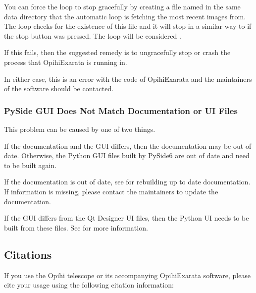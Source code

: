 \documentclass[letterpaper,11pt,english]{sphinxmanual}
\begin{document}
\sphinxAtStartPar
You can force the loop to stop gracefully by creating a file named
 in the same data directory that the automatic
loop is fetching the most recent images from. The loop checks for the
existence of this file and it will stop in a similar way to if the stop button
was pressed. The loop will be considered .

\sphinxAtStartPar
If this fails, then the suggested remedy is to ungracefully stop or crash the
process that OpihiExarata is running in.

\sphinxAtStartPar
In either case, this is an error with the code of OpihiExarata and the
maintainers of the software should be contacted.


\subsubsection{PySide GUI Does Not Match Documentation or UI Files}
\label{\detokenize{user/troubleshooting:pyside-gui-does-not-match-documentation-or-ui-files}}\label{\detokenize{user/troubleshooting:user-troubleshooting-pyside-gui-does-not-match-documentation-or-ui-files}}
\sphinxAtStartPar
This problem can be caused by one of two things.

\sphinxAtStartPar
If the documentation and the GUI differs, then the documentation may be out of
date. Otherwise, the Python GUI files built by PySide6 are out of date and
need to be built again.

\sphinxAtStartPar
If the documentation is out of date, see
{\hyperref[\detokenize{technical/installation/documentation:technical-installation-documentation}]{}} for rebuilding up to date
documentation. If information is missing, please contact the maintainers to
update the documentation.

\sphinxAtStartPar
If the GUI differs from the Qt Designer UI files, then the Python UI needs to
be built from these files. See
{\hyperref[\detokenize{technical/architecture/graphical_user_interface:technical-architecture-graphical-user-interface-building-ui-files}]{}} for
more information.

\sphinxstepscope


\subsection{Citations}
\label{\detokenize{user/citations:citations}}\label{\detokenize{user/citations:user-citations}}\label{\detokenize{user/citations::doc}}
\sphinxAtStartPar
If you use the Opihi telescope or its accompanying OpihiExarata software, please cite your usage using the following citation information:
\end{document}
